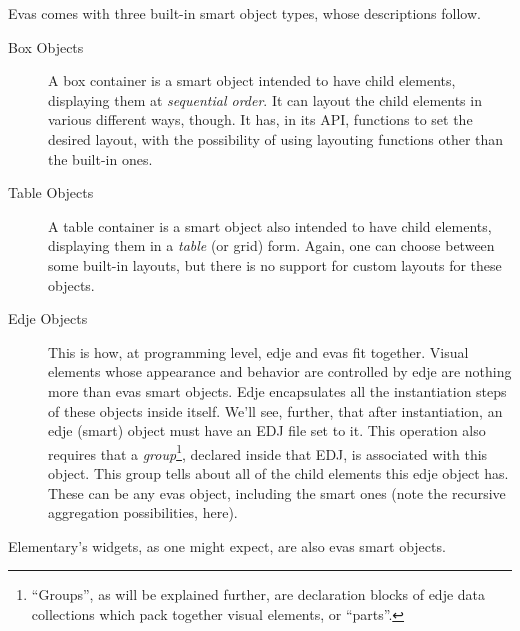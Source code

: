 \documentclass[a4paper]{profusion}
\begin{document}
Evas comes with three built-in smart object types, whose descriptions
follow.

\begin{description}

\item[Box Objects] A box container is a smart object intended to have
  child elements, displaying them at \emph{sequential order}. It can
  layout the child elements in various different ways, though. It has,
  in its API, functions to set the desired layout, with the
  possibility of using layouting functions other than the built-in
  ones.

\item[Table Objects] A table container is a smart object also intended
  to have child elements, displaying them in a \emph{table} (or grid)
  form.  Again, one can choose between some built-in layouts, but
  there is no support for custom layouts for these objects.


\item[Edje Objects] This is how, at programming level, edje and evas
  fit together. Visual elements whose appearance and behavior are
  controlled by edje are nothing more than evas smart objects. Edje
  encapsulates all the instantiation steps of these objects inside
  itself. We'll see, further, that after instantiation, an edje
  (smart) object must have an EDJ file set to it. This operation also
  requires that a \emph{group}\footnote{``Groups'', as will be
    explained further, are declaration blocks of edje data collections
    which pack together visual elements, or ``parts''.}, declared
  inside that EDJ, is associated with this object. This group tells
  about all of the child elements this edje object has. These can be
  any evas object, including the smart ones (note the recursive
  aggregation possibilities, here).
\end{description}

Elementary's widgets, as one might expect, are also evas smart
objects.
\end{document}
